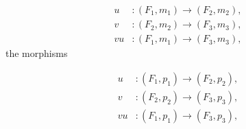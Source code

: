 \begin{equation}
  \begin{aligned}
    u&\colon(F_1,m_1)\longrightarrow(F_2,m_2),\\
    v&\colon(F_2,m_2)\longrightarrow(F_3,m_3),\\
    vu&\colon(F_1,m_1)\longrightarrow(F_3,m_3),
  \end{aligned}
  \tag{1.4.7.1}
\end{equation}
the morphisms

\begin{equation}
  \begin{aligned}
    u&\colon(F_1,p_1)\longrightarrow(F_2,p_2),\\
    v&\colon(F_2,p_2)\longrightarrow(F_3,p_3),\\
    vu&\colon(F_1,p_1)\longrightarrow(F_3,p_3),
  \end{aligned}
  \tag{1.4.7.2}
\end{equation}

